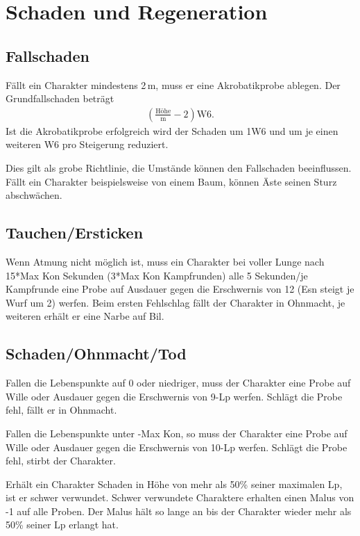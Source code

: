 \documentclass[../../Heldenanleitung2]{subfiles}
\begin{document}
\section{Schaden und Regeneration}

\subsection{Fallschaden}
Fällt ein Charakter mindestens 2\,m, muss er eine Akrobatikprobe ablegen. Der Grundfallschaden beträgt
\begin{align*}
	\left(\frac{\text{Höhe}}{\text{m}}-2\right)\text{W}6.
\end{align*}
Ist die Akrobatikprobe erfolgreich wird der Schaden um 1W6 und um je einen weiteren W6 pro Steigerung reduziert.

Dies gilt als grobe Richtlinie, die Umstände können den Fallschaden beeinflussen. Fällt ein Charakter beispielsweise von einem Baum, können Äste seinen Sturz abschwächen.

\subsection{Tauchen/Ersticken}
Wenn Atmung nicht möglich ist, muss ein Charakter bei voller Lunge nach 15*Max Kon Sekunden (3*Max Kon Kampfrunden) alle 5 Sekunden/je Kampfrunde eine Probe auf Ausdauer gegen die Erschwernis von 12 (Esn steigt je Wurf um 2) werfen. Beim ersten Fehlschlag fällt der Charakter in Ohnmacht, je weiteren erhält er eine Narbe auf Bil.

\subsection{Schaden/Ohnmacht/Tod}
Fallen die Lebenspunkte auf 0 oder niedriger, muss der Charakter eine Probe auf Wille oder Ausdauer gegen die Erschwernis von 9-Lp werfen. Schlägt die Probe fehl, fällt er in Ohnmacht.

Fallen die Lebenspunkte unter -Max Kon, so muss der Charakter eine Probe auf Wille oder Ausdauer gegen die Erschwernis von 10-Lp werfen. Schlägt die Probe fehl, stirbt der Charakter.

Erhält ein Charakter Schaden in Höhe von mehr als 50\% seiner maximalen Lp, ist er schwer verwundet. Schwer verwundete Charaktere erhalten einen Malus von -1 auf alle Proben. Der Malus hält so lange an bis der Charakter wieder mehr als 50\% seiner Lp erlangt hat.
\end{document}
